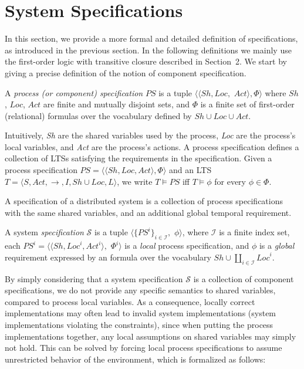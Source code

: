 \section{System Specifications}

In this section, we provide a more formal and detailed definition of specifications, as introduced in the previous section.  In the following definitions we  mainly use the first-order logic with transitive closure described in Section~2.  We start by giving a precise definition of the notion of component specification.

\begin{definition} A \emph{process (or component) specification} $\mathit{PS}$ is a tuple $\langle \langle \mathit{Sh},  \mathit{Loc},$ $\mathit{Act}\rangle, \Phi \rangle$ where $\mathit{Sh}$, $\mathit{Loc}$, $\mathit{Act}$ are finite and mutually disjoint sets, and $\Phi$ is a finite set of first-order (relational) formulas over the vocabulary defined by $\mathit{Sh} \cup \mathit{Loc} \cup \mathit{Act}$.
\end{definition}
Intuitively,  \textit{Sh} are the shared variables used by the process,  \textit{Loc} are the process's local variables, and \textit{Act} are the process's actions. A process specification defines a collection of LTSs satisfying the requirements in the specification. Given a process specification $\textit{PS}=\langle \langle \mathit{Sh},  \mathit{Loc}, \mathit{Act}\rangle, \Phi \rangle$ and an LTS $T=\langle S, \mathit{Act}, \rightarrow, I, \mathit{Sh}\cup\mathit{Loc} , L\rangle$, we write $T \vDash PS$ iff $T \vDash \phi$ for every $\phi \in \Phi$.
 
A specification of a distributed system is a collection of process specifications with the same shared variables, and an additional global temporal requirement.
\begin{definition} A system \emph{specification} $\mathcal{S}$ is a tuple $\langle \{ \textit{PS}^i \}_{i \in \mathcal{I}},$ $ \phi \rangle$, where $\mathcal{I}$ is a finite index set, each $\textit{PS}^i = \langle \langle \mathit{Sh}, \mathit{Loc}^i, \mathit{Act}^i\rangle,$ $\Phi^i \rangle$ is a \emph{local} process specification, and $\phi$ is a \emph{global} requirement expressed by an {\LTL} formula over the vocabulary $\mathit{Sh} \cup \coprod_{i \in \mathcal{I}} \mathit{Loc}^i$.
\end{definition}

By simply considering that a system specification $\mathcal{S}$ is a collection of component specifications, we do not provide any specific semantics to shared variables, compared to process local variables. As a consequence,  locally correct implementations may often lead to invalid system implementations (system implementations violating the constraints), since when putting the process implementations together,  any local assumptions on shared variables may simply not hold. This can be solved by forcing local process specifications to assume unrestricted behavior of the environment, which is formalized as follows: 
 
